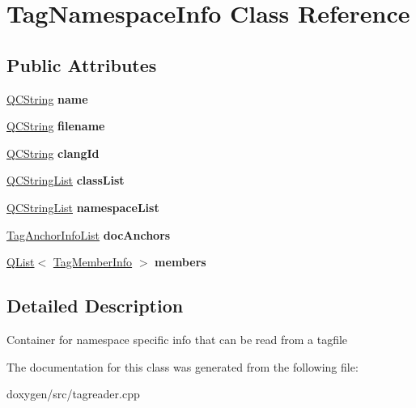 \hypertarget{class_tag_namespace_info}{}\section{Tag\+Namespace\+Info Class Reference}
\label{class_tag_namespace_info}
\subsection*{Public Attributes}
\begin{DoxyCompactItemize}
\item 
\mbox{\label{class_tag_namespace_info_a3480b0fae0fddbecf92713cd425333a3}} 
\mbox{\hyperlink{class_q_c_string}{Q\+C\+String}} {\bfseries name}
\item 
\mbox{\label{class_tag_namespace_info_ac8bd998116932e7629cecb3f6c88c911}} 
\mbox{\hyperlink{class_q_c_string}{Q\+C\+String}} {\bfseries filename}
\item 
\mbox{\label{class_tag_namespace_info_aa1363b426320df0fb2d324d5d845ed96}} 
\mbox{\hyperlink{class_q_c_string}{Q\+C\+String}} {\bfseries clang\+Id}
\item 
\mbox{\label{class_tag_namespace_info_a62b479facc31058313adfd18d68bd14e}} 
\mbox{\hyperlink{class_q_c_string_list}{Q\+C\+String\+List}} {\bfseries class\+List}
\item 
\mbox{\label{class_tag_namespace_info_a77aeff78c03769e65fa9e8cb451730a4}} 
\mbox{\hyperlink{class_q_c_string_list}{Q\+C\+String\+List}} {\bfseries namespace\+List}
\item 
\mbox{\label{class_tag_namespace_info_ac7b68ca719335aeac5ffa0115a0674ab}} 
\mbox{\hyperlink{class_tag_anchor_info_list}{Tag\+Anchor\+Info\+List}} {\bfseries doc\+Anchors}
\item 
\mbox{\label{class_tag_namespace_info_a987fc81066062fc21a0a9535a941c0db}} 
\mbox{\hyperlink{class_q_list}{Q\+List}}$<$ \mbox{\hyperlink{class_tag_member_info}{Tag\+Member\+Info}} $>$ {\bfseries members}
\end{DoxyCompactItemize}


\subsection{Detailed Description}
Container for namespace specific info that can be read from a tagfile 

The documentation for this class was generated from the following file\+:\begin{DoxyCompactItemize}
\item 
doxygen/src/tagreader.\+cpp\end{DoxyCompactItemize}
